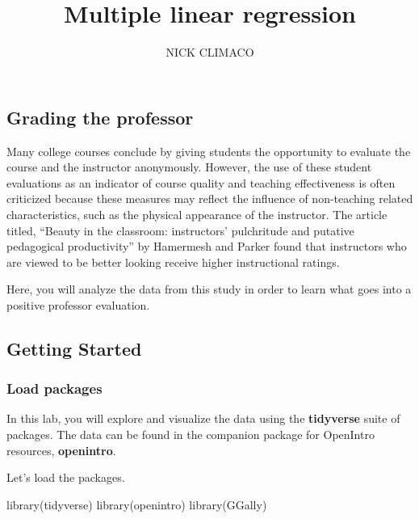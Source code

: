 \documentclass[
]{article}
\title{Multiple linear regression}
\author{NICK CLIMACO}
\date{}
\newenvironment{Shaded}{\begin{snugshade}}{\end{snugshade}}
\newcommand{\FunctionTok}[1]{\textcolor[rgb]{0.00,0.00,0.00}{#1}}
\newcommand{\NormalTok}[1]{#1}
\begin{document}
\maketitle

\hypertarget{grading-the-professor}{%
\subsection{Grading the professor}\label{grading-the-professor}}

Many college courses conclude by giving students the opportunity to
evaluate the course and the instructor anonymously. However, the use of
these student evaluations as an indicator of course quality and teaching
effectiveness is often criticized because these measures may reflect the
influence of non-teaching related characteristics, such as the physical
appearance of the instructor. The article titled, ``Beauty in the
classroom: instructors' pulchritude and putative pedagogical
productivity'' by Hamermesh and Parker found that instructors who are
viewed to be better looking receive higher instructional ratings.

Here, you will analyze the data from this study in order to learn what
goes into a positive professor evaluation.

\hypertarget{getting-started}{%
\subsection{Getting Started}\label{getting-started}}

\hypertarget{load-packages}{%
\subsubsection{Load packages}\label{load-packages}}

In this lab, you will explore and visualize the data using the
\textbf{tidyverse} suite of packages. The data can be found in the
companion package for OpenIntro resources, \textbf{openintro}.

Let's load the packages.

\begin{Shaded}
\begin{Highlighting}[]
\FunctionTok{library}\NormalTok{(tidyverse)}
\FunctionTok{library}\NormalTok{(openintro)}
\FunctionTok{library}\NormalTok{(GGally)}
\end{Highlighting}
\end{Shaded}
\end{document}
